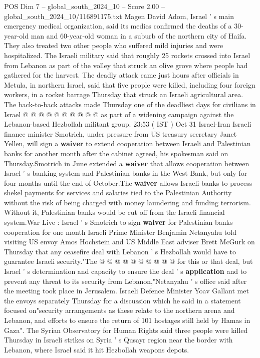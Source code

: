 \begin{textsample}{POS Dim 7 – global\_south\_2024\_10 – Score 2.00 – global\_south\_2024\_10/116891175.txt}
Magen David Adom, Israel ' s main emergency medical organization, said its medics confirmed the deaths of a 30-year-old man and 60-year-old woman in a suburb of the northern city of Haifa.
They also treated two other people who suffered mild injuries and were hospitalized.
The Israeli military said that roughly 25 rockets crossed into Israel from Lebanon as part of the volley that struck an olive grove where people had gathered for the harvest.
The deadly attack came just hours after officials in Metula, in northern Israel, said that five people were killed, including four foreign workers, in a rocket barrage Thursday that struck an Israeli agricultural area.
The back-to-back attacks made Thursday one of the deadliest days for civilians in Israel @ @ @ @ @ @ @ @ @ @ as part of a widening campaign against the Lebanon-based Hezbollah militant group. 23:53 ( IST ) Oct 31 Israel-Iran Israeli finance minister Smotrich, under pressure from US treasury secretary Janet Yellen, will sign a \textbf{waiver} to extend cooperation between Israeli and Palestinian banks for another month after the cabinet agreed, his spokesman said on Thursday.Smotrich in June extended a \textbf{waiver} that allows cooperation between Israel ' s banking system and Palestinian banks in the West Bank, but only for four months until the end of October.The \textbf{waiver} allows Israeli banks to process shekel payments for services and salaries tied to the Palestinian Authority without the risk of being charged with money laundering and funding terrorism.
Without it, Palestinian banks would be cut off from the Israeli financial system.War Live : Israel ' s Smotrich to sign \textbf{waiver} for Palestinian banks cooperation for one month Israeli Prime Minister Benjamin Netanyahu told visiting US envoy Amos Hochstein and US Middle East adviser Brett McGurk on Thursday that any ceasefire deal with Lebanon ' s Hezbollah would have to guarantee Israeli security."The @ @ @ @ @ @ @ @ @ @ for this or that deal, but Israel ' s determination and capacity to ensure the deal ' s \textbf{application} and to prevent any threat to its security from Lebanon,"Netanyahu ' s office said after the meeting took place in Jerusalem.
Israeli Defence Minister Yoav Gallant met the envoys separately Thursday for a discussion which he said in a statement focused on"security arrangements as these relate to the northern arena and Lebanon, and efforts to ensure the return of 101 hostages still held by Hamas in Gaza".
The Syrian Observatory for Human Rights said three people were killed Thursday in Israeli strikes on Syria ' s Qusayr region near the border with Lebanon, where Israel said it hit Hezbollah weapons depots.

\end{textsample}
